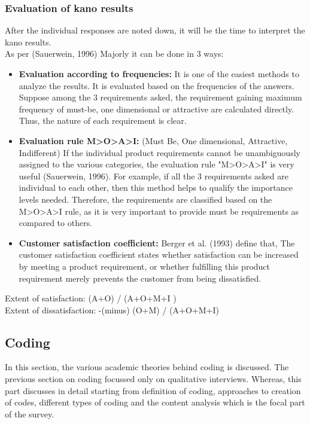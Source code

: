 \subsubsection{Evaluation of kano results}
After the individual responses are noted down, it will be the time to interpret the kano results.\\
As per (Sauerwein, 1996) Majorly it can be done in 3 ways:\\

\begin{itemize}
\item \textbf{Evaluation according to frequencies:} It is one of the easiest methods to analyze the results. It is evaluated based on the frequencies of the answers. Suppose among the 3 requirements asked, the requirement gaining maximum frequency of must-be, one dimensional or attractive are calculated directly. Thus, the nature of each requirement is clear.\\

\item \textbf{Evaluation rule M>O>A>I:} (Must Be, One dimensional, Attractive, Indifferent)
If the individual product requirements cannot be unambiguously assigned to the various categories, the evaluation rule "M>O>A>I" is very useful (Sauerwein, 1996). For example, if all the 3 requirements asked are individual to each other, then this method helps to qualify the importance levels needed. Therefore, the requirements are classified based on the M>O>A>I rule, as it is very important to provide must be requirements as compared to others.\\

\item \textbf{Customer satisfaction coefficient:} Berger et al. (1993) define that, The customer satisfaction coefficient states whether satisfaction can be increased by meeting a product requirement, or whether fulfilling this product requirement merely prevents the customer from being dissatisfied.\\
\end{itemize}
Extent of satisfaction: (A+O) / (A+O+M+I )\\
Extent of dissatisfaction: -(minus) (O+M) / (A+O+M+I)\\

\subsection{Coding}
In this section, the various academic theories behind coding is discussed. The previous section on coding focussed only on qualitative interviews. Whereas, this part discusses in detail starting from definition of coding, approaches to creation of codes, different types of coding and the content analysis which is the focal part of the survey.\\

